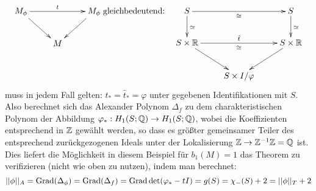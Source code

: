 \begin{bsp}
    	\begin{eqnarray*}
    		\begin{xy}
    			\xymatrix{
    				M_\phi \ar[rr]^t \ar[dr] && M_\phi \ar[dl]\\
    				&M&}
    		\end{xy} 
    		&
    		\text{gleichbedeutend:}
    		&
    		    	\begin{xy}
    			\xymatrix{
    				S \ar[d]^{\simeq} \ar[rr]_\cong && S \ar[d]^{\simeq} \\
    				S \times \RR \ar[rr]^{\hat t}_\cong \ar[dr] && S\times \RR \ar[dl]\\
    				&S\times I / \varphi&}
    		\end{xy}
    	\end{eqnarray*}
    	muss in jedem Fall gelten: $t_* = \hat t_* = \varphi$ unter gegebenen Identifikationen mit $S$. Also berechnet sich das Alexander Polynom $\Delta_f$ zu dem charakteristischen Polynom der Abbildung $\varphi_*:H_1(S;\mathbb{Q})\to H_1(S;\mathbb{Q})$, wobei die Koeffizienten entsprechend in $\mathbb{Z}$ gewählt werden, so dass es größter gemeinsamer Teiler des entsprechend zurückgezogenen Ideals unter der Lokalisierung $\mathbb{Z} \to \mathbb{Z}^{-1}\mathbb{Z}=\mathbb{Q}$ ist.\\
        Dies liefert die Möglichkeit in diesem Beispiel für $b_1(M)=1$ das Theorem zu verifizieren (nicht wie oben zu nutzen), indem man berechnet: 
        \[
            ||\phi||_A=\operatorname{Grad}(\Delta_\phi)=\operatorname{Grad} (\Delta_f) = \operatorname{Grad} \det (\varphi_*-tI) = g(S) = \chi_-(S) +2 = ||\phi||_T+2
        \]

    \end{bsp}